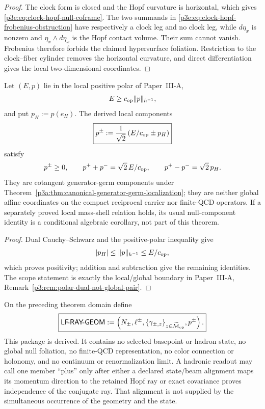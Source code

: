 \documentclass[12pt,a4paper]{article}
\begin{document}
\begin{proof}
The clock form is closed and the Hopf curvature is horizontal, which gives
\eqref{p3e:eq:clock-hopf-null-coframe}.  The two summands in
\eqref{p3e:eq:clock-hopf-frobenius-obstruction} have respectively a clock leg
and no clock leg, while \(d\eta_x\) is nonzero and
\(\eta_x\wedge d\eta_x\) is the Hopf contact volume.  Their sum cannot
vanish.  Frobenius therefore forbids the claimed hypersurface foliation.
Restriction to the clock--fiber cylinder removes the horizontal curvature,
and direct differentiation gives the local two-dimensional coordinates.
\end{proof}

\begin{theorem}
\label{p3e:thm:positive-null-generator-components}
Let \((E,p)\) lie in the local positive polar of Paper~III-A,
\[
 E\ge c_{\rm op}\|p\|_{h^{-1}},
\]
and put \(p_H:=p(e_H)\).  The derived local components
\begin{equation}
\label{p3e:eq:positive-null-generator-components}
 \boxed{
 p^\pm:=\frac1{\sqrt2}
 \left(E/c_{\rm op}\pm p_H\right)}
\end{equation}
satisfy
\[
 p^\pm\ge0,
 \qquad p^++p^-=\sqrt2\,E/c_{\rm op},
 \qquad p^+-p^-=\sqrt2\,p_H .
\]
They are cotangent generator-germ components under
Theorem~\ref{p3a:thm:canonical-generator-germ-localization}; they are neither
global affine coordinates on the compact reciprocal carrier nor finite-QCD
operators.  If a separately proved local mass-shell relation holds, its
usual null-component identity is a conditional algebraic corollary, not part
of this theorem.
\end{theorem}

\begin{proof}
Dual Cauchy--Schwarz and the positive-polar inequality give
\[
 |p_H|\le\|p\|_{h^{-1}}\le E/c_{\rm op},
\]
which proves positivity; addition and subtraction give the remaining
identities.  The scope statement is exactly the local/global boundary in
Paper~III-A, Remark~\ref{p3:rem:polar-dual-not-global-pair}.
\end{proof}

\begin{definition}
\label{p3e:def:lf-ray-geometry-package}
On the preceding theorem domain define
\[
 \boxed{
 \mathsf{LF\!\mbox{-}RAY\!\mbox{-}GEOM}
 :=\left(N_\pm,\ell^\pm,
          \{\gamma_{\pm,z}\}_{z\in\widetilde{\mathcal M}_{\rm op}},
          p^\pm\right).}
\]
This package is derived.  It contains no selected basepoint or hadron state,
no global null foliation, no finite-QCD representation, no color connection
or holonomy, and no continuum or renormalization limit.  A hadronic readout
may call one member ``plus'' only after either a declared state/beam alignment
maps its momentum direction to the retained Hopf ray or exact covariance
proves independence of the conjugate ray.  That alignment is not supplied by
the simultaneous occurrence of the geometry and the state.
\end{definition}
\end{document}
